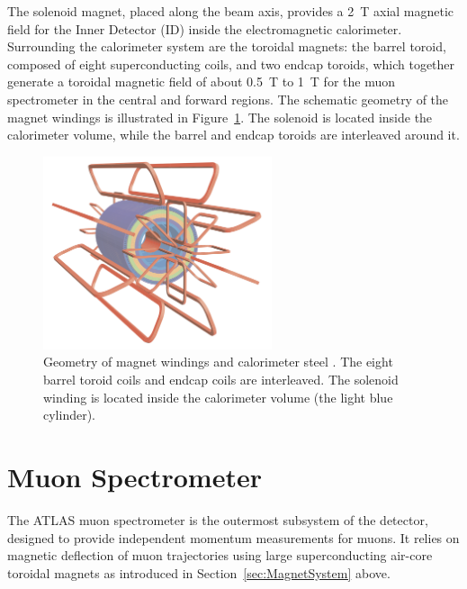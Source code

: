 The solenoid magnet, placed along the beam axis, provides a 2~T axial magnetic field for the Inner Detector (ID) inside the electromagnetic calorimeter. Surrounding the calorimeter system are the toroidal magnets: the barrel toroid, composed of eight superconducting coils, and two endcap toroids, which together generate a toroidal magnetic field of about 0.5~T to 1~T for the muon spectrometer in the central and forward regions. The schematic geometry of the magnet windings is illustrated in Figure~\ref{fig:magnet_windings}. The solenoid is located inside the calorimeter volume, while the barrel and endcap toroids are interleaved around it. 

\begin{figure}[htbp]
  \centering
  \includegraphics[width=0.6\textwidth]{figs/chapter2/magnet_windings.png}
  \caption{Geometry of magnet windings and calorimeter steel \cite{ATLASDetector2008}. The eight barrel toroid coils and endcap coils are interleaved. The solenoid winding is located inside the calorimeter volume (the light blue cylinder).}
  \label{fig:magnet_windings}
\end{figure}

\section{Muon Spectrometer} \label{sec:MuonSpectrometer}
The ATLAS muon spectrometer is the outermost subsystem of the detector, designed to provide independent momentum measurements for muons. It relies on magnetic deflection of muon trajectories using large superconducting air-core toroidal magnets as introduced in Section~\ref{sec:MagnetSystem} above.

